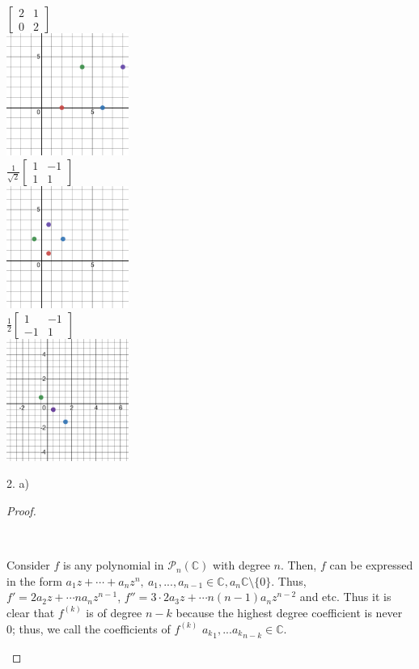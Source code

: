 \documentclass[11pt]{article}
\newcommand{\C}{\mathbb{C}}
\newenvironment{myproof}
{\begin{proof} \begin{adjustwidth}{3em}{0pt}$ $\par\nobreak\ignorespaces}
{\end{adjustwidth} \end{proof}}
\begin{document}
\begin{flushleft}
$\begin{bmatrix}
2 & 1 \\
0 & 2
\end{bmatrix}$ \\
\includegraphics[width=0.3\textwidth]{square4.png} \\

$\frac{1}{\sqrt{2}} \begin{bmatrix}
1 & -1 \\
1 & 1
\end{bmatrix}$ \\
\includegraphics[width=0.3\textwidth]{square5.png} \\

$\frac{1}{2} \begin{bmatrix}
1 & -1 \\
-1 & 1
\end{bmatrix}$ \\
\includegraphics[width=0.3\textwidth]{square6.png} \\

\newpage

2. a)

\begin{myproof}

Consider $f$ is any polynomial in $\mathcal{P}_n(\C)$ with degree $n$. Then, $f$ can be expressed in the form $a_1z + \cdots + a_nz^n, \ a_1,...,a_{n-1} \in \C, a_n \C \setminus \{ 0 \}$. Thus, $f' = 2a_2z + \cdots na_nz^{n-1}$, $f'' = 3 \cdot 2 a_3z + \cdots n(n-1)a_nz^{n-2}$ and etc. Thus it is clear that $f^{(k)}$ is of degree $n-k$ because the highest degree coefficient is never 0; thus, we call the coefficients of $f^{(k)}$ ${a_k}_1,...{a_k}_{n-k} \in \C$. \\
\bigskip


\end{myproof}
\end{flushleft}
\end{document}
